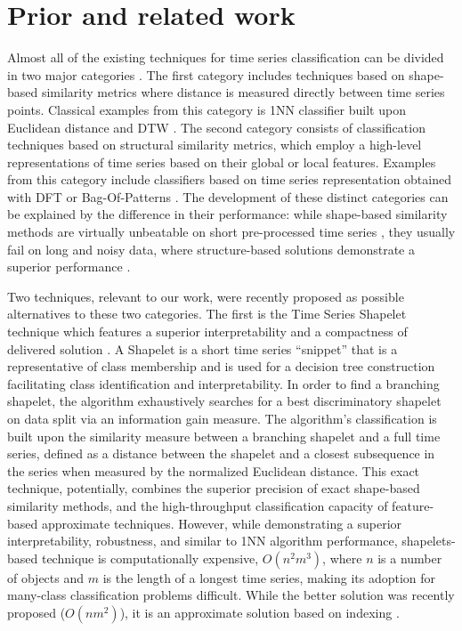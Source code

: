 \documentclass[conference]{IEEEtran}
\begin{document}
\vspace{-0.2cm}
\section{Prior and related work} \label{prior}
Almost all of the existing techniques for time series classification can be divided 
in two major categories \cite{comparison}. 
The first category includes techniques based on shape-based similarity metrics 
where distance is measured directly between time series points. 
Classical examples from this category is 1NN classifier 
built upon Euclidean distance \cite{1NN} and DTW \cite{DTW}. 
The second category consists of classification techniques based on 
structural similarity metrics, which employ a high-level representations 
of time series based on their global or local features. 
Examples from this category include classifiers based on 
time series representation obtained with DFT \cite{DFT} or Bag-Of-Patterns \cite{bag_patterns}. 
The development of these distinct categories can be explained by 
the difference in their performance: 
while shape-based similarity methods are virtually unbeatable on short 
pre-processed time series \cite{benchmark}, 
they usually fail on long and noisy data, where structure-based solutions 
demonstrate a superior performance \cite{bag_patterns}. 

Two techniques, relevant to our work, were recently proposed as possible 
alternatives to these two categories.
The first is the Time Series Shapelet technique which features a superior 
interpretability and a compactness of delivered solution \cite{shapelet}. 
A Shapelet is a short time series ``snippet'' that is a representative of class
membership and is used for a decision tree construction facilitating class 
identification and interpretability.
In order to find a branching shapelet, the algorithm exhaustively searches 
for a best discriminatory shapelet on data split via an information gain measure. 
The algorithm's classification is built upon the similarity measure between a branching 
shapelet and a full time series, defined as a distance between the shapelet and 
a closest subsequence in the series when measured by the normalized Euclidean distance. 
This exact technique, potentially, combines the superior precision of 
exact shape-based similarity methods, and the high-throughput 
classification capacity of feature-based approximate techniques. 
However, while demonstrating a superior interpretability, robustness, 
and similar to 1NN algorithm performance, shapelets-based technique is 
computationally expensive, $O(n^{2}m^{3})$, where $n$ is a number of 
objects and $m$ is the length of a longest time series, making 
its adoption for many-class classification problems difficult\cite{bagnal}. 
While the better solution was recently proposed ($O(nm^{2})$), it is an 
approximate solution based on indexing \cite{fast-shapelets}.
\end{document}
